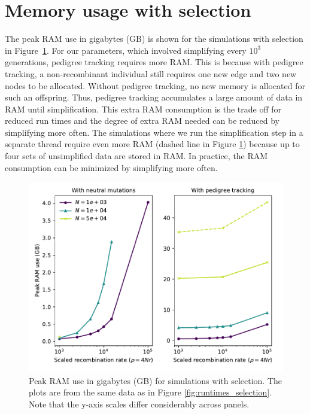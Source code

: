 \documentclass{article}
\newcommand{\krt}[1]{{\em \color{green} #1}}
\begin{document}

\section{Memory usage with selection}
\label{ss:memuse}
\renewcommand{\thefigure}{B\arabic{figure}}
\setcounter{figure}{0}

The peak RAM use in gigabytes (GB) is shown for the simulations with selection in Figure~\ref{sfig:ramsel}.  For our parameters, which involved simplifying every
$10^3$ generations,  pedigree tracking requires more RAM.  This is because with pedigree tracking, a non-recombinant
individual still requires one new edge and two new nodes to be allocated.  Without pedigree tracking, no new memory is
allocated for such an offspring.  Thus, pedigree tracking accumulates a large amount of data in RAM until
simplification.  This extra RAM consumption is the trade off for reduced run times and the degree of extra RAM needed
can be reduced by simplifying more often.  The simulations where we run the simplification step in a separate thread
require even more RAM (dashed line in Figure \ref{sfig:ramsel}) because up to four sets of unsimplified data are
stored in RAM.  In practice, the RAM consumption can be minimized by simplifying more often.


\begin{figure}
    \includegraphics[]{sims/memuse}
    \caption{\label{sfig:ramsel}Peak RAM use in gigabytes (GB) for simulations with selection.  The plots are from the
        same data as in Figure \ref{fig:runtimes_selection}. Note that the y-axis scales differ considerably across
    panels.}
\end{figure}
\end{document}
